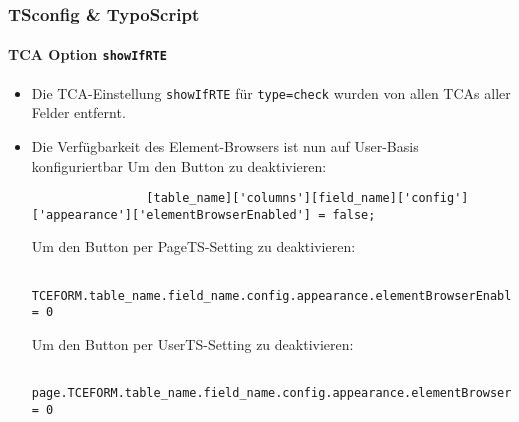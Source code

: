 \begin{frame}[fragile]
	\frametitle{TSconfig \& TypoScript}
	\framesubtitle{TCA Option \texttt{showIfRTE}}

	\lstset{basicstyle=\tiny\ttfamily}

	\begin{itemize}
		\item Die TCA-Einstellung \texttt{showIfRTE} für \texttt{type=check} wurden von allen TCAs aller Felder entfernt.
		\item Die Verfügbarkeit des Element-Browsers ist nun auf User-Basis konfiguriertbar\newline
			\smaller
				Um den Button zu deaktivieren:
			\normalsize

			\begin{lstlisting}
				[table_name]['columns'][field_name]['config']['appearance']['elementBrowserEnabled'] = false;
			\end{lstlisting}

			\smaller
				Um den Button per PageTS-Setting zu deaktivieren:
			\normalsize

			\begin{lstlisting}
				TCEFORM.table_name.field_name.config.appearance.elementBrowserEnabled = 0
			\end{lstlisting}

			\smaller
				Um den Button per UserTS-Setting zu deaktivieren:
			\normalsize

			\begin{lstlisting}
				page.TCEFORM.table_name.field_name.config.appearance.elementBrowserEnabled = 0
			\end{lstlisting}

	\end{itemize}

\end{frame}


